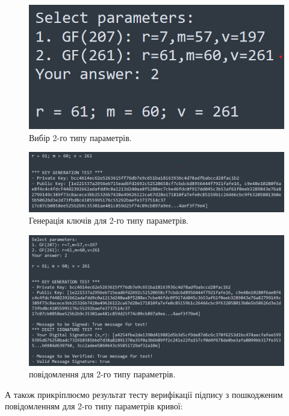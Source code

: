 \begin{figure}[ht]
    \centering
    \includegraphics[scale = 0.7]{IMAGES/select_param2.png}
    \caption{Вибір 2-го типу параметрів.}
    \label{fig1}
\end{figure}

\begin{figure}[ht]
    \centering
    \includegraphics[scale = 0.6]{IMAGES/key_gen2.png}
    \caption{Генерація ключів для 2-го типу параметрів.}
    \label{fig1}
\end{figure}

\begin{figure}[ht!]
    \centering
    \includegraphics[scale = 0.6]{IMAGES/digit_sign_testT2.png}
    \caption{ повідомлення для 2-го типу параметрів.}
    \label{fig1}
\end{figure}

\newpage
А також прикріплюємо результат тесту верифікації підпису з пошкодженим повідомленням для 2-го типу параметрів кривої:

